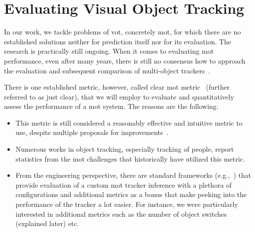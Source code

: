 \section{Evaluating Visual Object Tracking}
\label{sec:EvaluatingVisualObjectTracking}

In our work, we tackle problems of \Gls{vot}, concretely \gls{mot}, for which there are no established solutions neither for prediction itself nor for its evaluation. The research is practically still ongoing. When it comes to evaluating \gls{mot} performance, even after many years, there is still no consensus how to approach the evaluation and subsequent comparison of multi-object trackers~\cite{bernardin2008clearmot}.

There is one established metric, however, called \gls{clear} \gls{mot} metric~\cite{bernardin2008clearmot} (further referred to as just \gls{clear}), that we will employ to evaluate and quantitatively assess the performance of a \gls{mot} system. The reasons are the following:
\begin{itemize}
    \item This metric is still considered a reasonably effective and intuitive metric to use, despite multiple proposals for improvements~\cite{wen2020uadetrac}.
    \item Numerous works in object tracking, especially tracking of people, report statistics from the \gls{mot} challenges that historically have utilized this metric.
    \item From the engineering perspective, there are standard frameworks (e.g.,~\cite{webpymotmetrics}) that provide evaluation of a custom \gls{mot} tracker inference with a plethora of configurations and additional metrics as a bonus that make peeking into the performance of the tracker a lot easier. For instance, we were particularly interested in additional metrics such as the number of object switches (explained later) etc.
\end{itemize}

